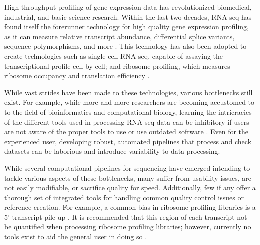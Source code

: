 \documentclass[11pt, a4paper, oneside]{article}
\begin{document}
High-throughput profiling of gene expression data has revolutionized biomedical, industrial, and basic science research. Within the last two decades, RNA-seq has found itself the forerunner technology for high quality gene expression profiling, as it can measure relative transcript abundance, differential splice variants, sequence polymorphisms, and more \cite{byron_nrg}. This technology has also been adopted to create technologies such as single-cell RNA-seq, capable of assaying the transcriptional profile cell by cell; and ribosome profiling, which measures ribosome occupancy and translation efficiency \cite{ingolia_science}.

While vast strides have been made to these technologies, various bottlenecks still exist. For example, while more and more researchers are becoming accustomed to to the field of bioinformatics and computational biology, learning the intricracies of the different tools used in processing RNA-seq data can be inhibitory if users are not aware of the proper tools to use or use outdated software \cite{costello_npjsba, funari_science}. Even for the experienced user, developing robust, automated pipelines that process and check datasets can be laborious and introduce variability to data processing.

While several computational pipelines for sequencing have emerged intending to tackle various aspects of these bottlenecks, many suffer from usability issues, are not easily modifiable, or sacrifice quality for speed. Additionally, few if any offer a thorough set of integrated tools for handling common quality control issues or reference creation. For example, a common bias in ribosome profiling libraries is a 5' transcript pile-up \cite{gerashchenko_nar, artieri_gr, hussman_plosg}. It is recommended that this region of each transcript not be quantified when processing ribosome profiling libraries; however, currently no tools exist to aid the general user in doing so \cite{ingolia_meth, weinberg_reports}.
\end{document}
